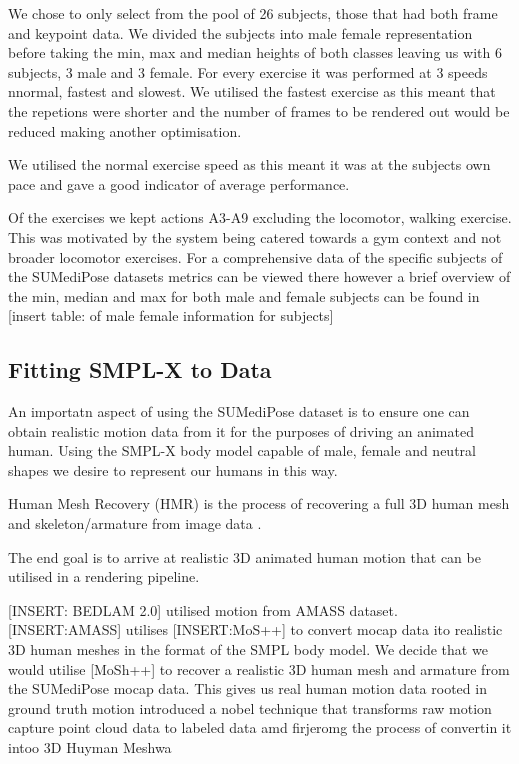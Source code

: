 We chose to only select from the pool of 26 subjects, those that had both frame and keypoint data. 
We divided the subjects into male female representation before taking the min, max and median heights of both classes leaving us with 6 subjects, 3 male and 3 female.
For every exercise it was performed at 3 speeds nnormal, fastest and slowest. We utilised the fastest exercise as this meant that the repetions were shorter and the number of frames to be rendered out would be reduced making another optimisation.

We utilised the normal exercise speed as this meant it was at the subjects own pace and gave a good indicator of average performance.

Of the exercises we kept actions A3-A9 excluding the locomotor, walking exercise. This was motivated by the system being catered towards a gym context and not broader locomotor exercises.
For a comprehensive data of the specific subjects of the SUMediPose datasets metrics can be viewed there however a brief overview of the min, median and max for both male and female subjects can be found in [insert table: of male female information for subjects]


\subsection{Fitting SMPL-X to Data}

An importatn aspect of using the SUMediPose dataset is to ensure one can obtain realistic motion data from it for the purposes of driving an animated human. 
Using the SMPL-X body model capable of male, female and neutral shapes we desire to represent our humans in this way. 

Human Mesh Recovery (HMR) is the process of recovering a full 3D human mesh and skeleton/armature from image data \cite{kanazawa2018end}. 

The end goal is to arrive at realistic 3D animated human motion that can be utilised in a rendering pipeline.

[INSERT: BEDLAM 2.0] utilised motion from AMASS dataset. [INSERT:AMASS] utilises [INSERT:MoS++] to convert mocap data ito realistic 3D human meshes in the format of the SMPL body model. 
We decide that we would utilise [MoSh++] to recover a realistic 3D human mesh and armature from the SUMediPose mocap data. This gives us real human motion data rooted in ground truth motion 
\citet{ghorbani2021soma} introduced a nobel technique that transforms raw motion capture point cloud data to labeled data amd firjeromg the process of convertin it intoo 3D Huyman Meshwa

